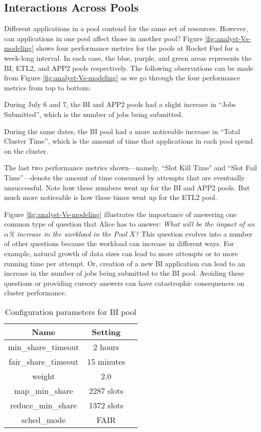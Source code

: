 \subsection {Interactions Across Pools}
Different applications in a pool contend for the same set of resources. 
However, can applications in one pool affect those in another pool?
Figure \ref{fig:analyst-Vs-modeling} shows four performance metrics 
for the pools at Rocket Fuel for a week-long interval. In each
case, the blue, purple, and green areas represents the BI, ETL2, 
and APP2 pools respectively. The following observations can be made 
from Figure \ref{fig:analyst-Vs-modeling} as we go through 
the four performance metrics from top to bottom: 

\squishlist

\item During July 6 and 7, the BI and APP2 pools had a slight increase 
in ``Jobs Submitted'', which is the number of jobs being submitted.
\item During the same dates, the BI pool had a more noticeable 
increase in ``Total Cluster Time'', which is the amount of time 
that applications in each pool spend on the cluster. 
\item The last two performance metrics shown---namely, ``Slot Kill Time"
and ``Slot Fail Time''---denote the amount of time consumed by 
attempts that are eventually unsuccessful. Note how these numbers
went up for the BI and APP2 pools. But much more noticeable is how these
times went up for the ETL2 pool. 

\squishend 

Figure \ref{fig:analyst-Vs-modeling} illustrates the importance of 
answering one common type of question that Alice has to answer:
{\em What will be the impact of an $\alpha$\% increase in the workload in 
the Pool $X$?} This question evolves into a number of other 
questions because the workload can increase in different ways. 
For example, natural growth of data sizes can lead to more attempts
or to more running time per attempt. Or, creation of a new BI application
can lead to an increase in the number of jobs being submitted to 
the BI pool. Avoiding these questions or providing cursory 
answers can have catastrophic consequences on cluster performance. 


\begin{table}
  \centering
  \caption{Configuration parameters for BI pool}
  \begin{tabular}{|c|c|l|} \hline
    Name & Setting \\ \hline
  min\_share\_timeout & 2 hours\\ \hline
                  fair\_share\_timeout & 15 minutes\\ \hline
                  weight & 2.0 \\ \hline
                  map\_min\_share & 2287 slots \\ \hline
                  reduce\_min\_share & 1372 slots \\ \hline
                  sched\_mode & FAIR \\ \hline
    \hline\end{tabular}
    \label{tab:scheduler-config}
\end{table}

